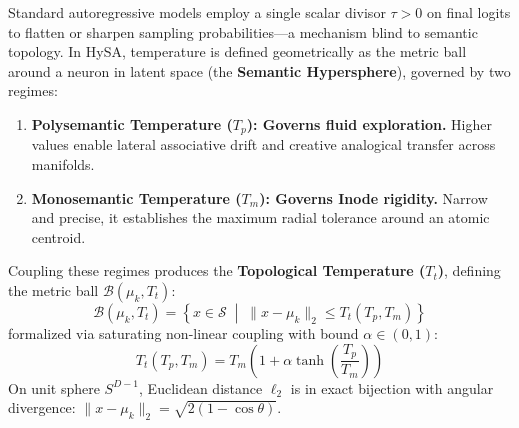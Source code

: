 \documentclass[11pt,a4paper]{article}
\theoremstyle{definition}
\begin{document}
Standard autoregressive models employ a single scalar divisor $\tau > 0$ on final logits to flatten or sharpen sampling probabilities—a mechanism blind to semantic topology. In HySA, temperature is defined geometrically as the metric ball around a neuron in latent space (the \textbf{Semantic Hypersphere}), governed by two regimes:

\begin{enumerate}[leftmargin=*, itemsep=2.0pt]
    \item \textbf{Polysemantic Temperature ($T_p$): Governs fluid exploration.} Higher values enable lateral associative drift and creative analogical transfer across manifolds.
    \item \textbf{Monosemantic Temperature ($T_m$): Governs Inode rigidity.} Narrow and precise, it establishes the maximum radial tolerance around an atomic centroid.
\end{enumerate}

Coupling these regimes produces the \textbf{Topological Temperature ($T_t$)}, defining the metric ball $\mathcal{B}(\mu_k, T_t)$:
\begin{equation}
    \mathcal{B}(\mu_k, T_t) = \left\{ x \in \mathcal{S} \;\middle|\; \| x - \mu_k \|_2 \le T_t(T_p, T_m) \right\}
\end{equation}
formalized via saturating non-linear coupling with bound $\alpha \in (0, 1)$:
\begin{equation}
    T_t(T_p, T_m) = T_m \left( 1 + \alpha \tanh\left( \frac{T_p}{T_m} \right) \right)
\end{equation}
On unit sphere $S^{D-1}$, Euclidean distance $\ell_2$ is in exact bijection with angular divergence: $\|x - \mu_k\|_2 = \sqrt{2(1 - \cos\theta)}$.
\end{document}
